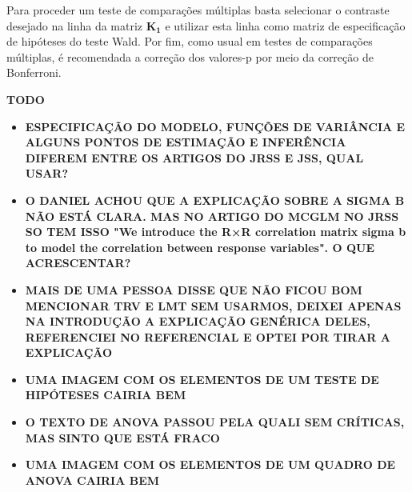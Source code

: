 Para proceder um teste de comparações múltiplas basta selecionar o contraste desejado na linha da matriz $\boldsymbol{K_1}$ e utilizar esta linha como matriz de especificação de hipóteses do teste Wald. Por fim, como usual em testes de comparações múltiplas, é recomendada a correção dos valores-p por meio da correção de Bonferroni.


\vspace{2cm}

\textbf{TODO}

\begin{itemize}
  
  \item \textbf{ESPECIFICAÇÃO DO MODELO, FUNÇÕES DE VARIÂNCIA E ALGUNS PONTOS DE ESTIMAÇÃO E INFERÊNCIA DIFEREM ENTRE OS ARTIGOS DO JRSS E JSS, QUAL USAR?}
  
  \item \textbf{O DANIEL ACHOU QUE A EXPLICAÇÃO SOBRE A SIGMA B NÃO ESTÁ CLARA. MAS NO ARTIGO DO MCGLM NO JRSS SO TEM ISSO "We introduce the R×R correlation matrix sigma b to model the correlation between response variables". O QUE ACRESCENTAR?}
  
  \item \textbf{MAIS DE UMA PESSOA DISSE QUE NÃO FICOU BOM MENCIONAR TRV E LMT SEM USARMOS, DEIXEI APENAS NA INTRODUÇÃO A EXPLICAÇÃO GENÉRICA DELES, REFERENCIEI NO REFERENCIAL E OPTEI POR TIRAR A EXPLICAÇÃO}

  \item \textbf{UMA IMAGEM COM OS ELEMENTOS DE UM TESTE DE HIPÓTESES CAIRIA BEM}
  
  \item \textbf{O TEXTO DE ANOVA PASSOU PELA QUALI SEM CRÍTICAS, MAS SINTO QUE ESTÁ FRACO}
  
  \item \textbf{UMA IMAGEM COM OS ELEMENTOS DE UM QUADRO DE ANOVA CAIRIA BEM}
    
\end{itemize}
